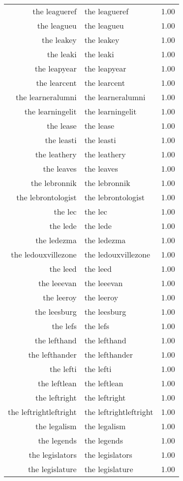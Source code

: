 \begin{table}[ht]
\begin{tabular}{rlr}
  the leagueref & the leagueref & 1.00 \\ 
  the leagueu & the leagueu & 1.00 \\ 
  the leakey & the leakey & 1.00 \\ 
  the leaki & the leaki & 1.00 \\ 
  the leapyear & the leapyear & 1.00 \\ 
  the learcent & the learcent & 1.00 \\ 
  the learneralumni & the learneralumni & 1.00 \\ 
  the learningelit & the learningelit & 1.00 \\ 
  the lease & the lease & 1.00 \\ 
  the leasti & the leasti & 1.00 \\ 
  the leathery & the leathery & 1.00 \\ 
  the leaves & the leaves & 1.00 \\ 
  the lebronnik & the lebronnik & 1.00 \\ 
  the lebrontologist & the lebrontologist & 1.00 \\ 
  the lec & the lec & 1.00 \\ 
  the lede & the lede & 1.00 \\ 
  the ledezma & the ledezma & 1.00 \\ 
  the ledouxvillezone & the ledouxvillezone & 1.00 \\ 
  the leed & the leed & 1.00 \\ 
  the leeevan & the leeevan & 1.00 \\ 
  the leeroy & the leeroy & 1.00 \\ 
  the leesburg & the leesburg & 1.00 \\ 
  the lefs & the lefs & 1.00 \\ 
  the lefthand & the lefthand & 1.00 \\ 
  the lefthander & the lefthander & 1.00 \\ 
  the lefti & the lefti & 1.00 \\ 
  the leftlean & the leftlean & 1.00 \\ 
  the leftright & the leftright & 1.00 \\ 
  the leftrightleftright & the leftrightleftright & 1.00 \\ 
  the legalism & the legalism & 1.00 \\ 
  the legends & the legends & 1.00 \\ 
  the legislators & the legislators & 1.00 \\ 
  the legislature & the legislature & 1.00 \\ 

\end{tabular}
\end{table}
